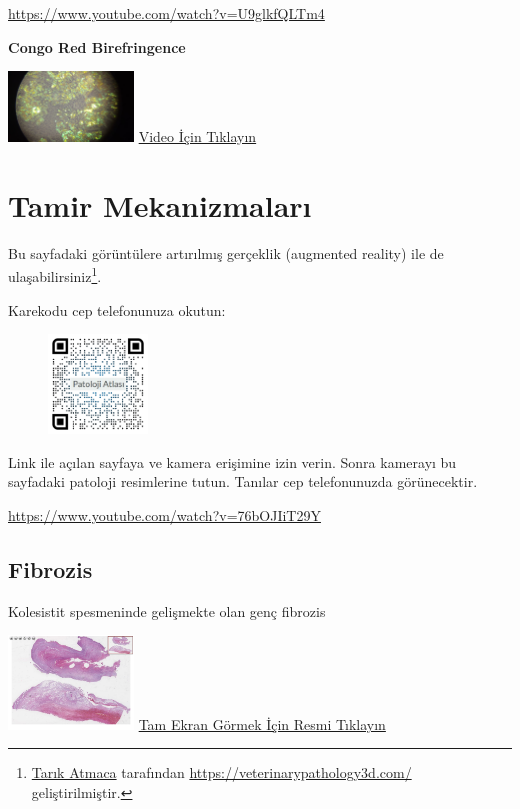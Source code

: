 \documentclass[
  letterpaper,
  DIV=11,
  numbers=noendperiod]{scrreprt}
\begin{document}
\url{https://www.youtube.com/watch?v=U9glkfQLTm4}

\textbf{Congo Red Birefringence}

\href{https://www.youtube.com/watch?v=U9glkfQLTm4}{\includegraphics[width=0.25\textwidth,height=\textheight]{./screenshots/congored_video_screenshot.png}}
\href{https://www.youtube.com/watch?v=U9glkfQLTm4}{Video İçin Tıklayın}

\hypertarget{sec-tamir-mekanizmalari}{%
\chapter{Tamir Mekanizmaları}\label{sec-tamir-mekanizmalari}}

Bu sayfadaki görüntülere artırılmış gerçeklik (augmented reality) ile de
ulaşabilirsiniz\footnote{\href{https://github.com/veterinarypathology3d}{Tarık
  Atmaca} tarafından \url{https://veterinarypathology3d.com/}
  geliştirilmiştir.}.

Karekodu cep telefonunuza okutun:

\begin{figure}

\includegraphics[width=1.04167in,height=\textheight]{images/AR-tamir.jpeg} \hfill{}

\end{figure}

Link ile açılan sayfaya ve kamera erişimine izin verin. Sonra kamerayı
bu sayfadaki patoloji resimlerine tutun. Tanılar cep telefonunuzda
görünecektir.

\url{https://www.youtube.com/watch?v=76bOJIiT29Y}

\hypertarget{sec-fibrozis}{%
\section{Fibrozis}\label{sec-fibrozis}}

Kolesistit spesmeninde gelişmekte olan genç fibrozis

\href{https://images.patolojiatlasi.com/fibrosis/HE.html}{\includegraphics[width=0.25\textwidth,height=\textheight]{./screenshots/fibrosis_screenshot.png}}
\href{https://images.patolojiatlasi.com/fibrosis/HE.html}{Tam Ekran
Görmek İçin Resmi Tıklayın}
\end{document}
